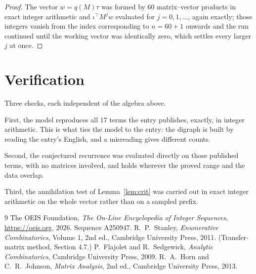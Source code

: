 \documentclass[11pt,a4paper]{article}
\theoremstyle{plain}
\theoremstyle{definition}
\begin{document}
\begin{proof}
The vector $w=q(M)\tau$ was formed by $60$ matrix--vector products in exact integer
arithmetic and $\iota^{\!\top}M^{j}w$ evaluated for $j=0,1,\dots$, again exactly; those
integers vanish from the index corresponding to $n=60+1$ onwards and the run continued
until the working vector was identically zero, which settles every larger $j$ at once.
\end{proof}

\section{Verification}

Three checks, each independent of the algebra above.

First, the model reproduces all $17$ terms the entry publishes, exactly, in integer
arithmetic. This is what ties the model to the entry: the digraph is built by reading the
entry's English, and a misreading gives different counts.

Second, the conjectured recurrence was evaluated directly on those published terms, with no
matrices involved, and holds wherever the proved range and the data overlap.

Third, the annihilation test of Lemma~\ref{lem:crit} was carried out in exact integer
arithmetic on the whole vector rather than on a sampled prefix.

\begin{thebibliography}{9}
 The OEIS Foundation, \emph{The On-Line Encyclopedia of Integer
Sequences}, \url{https://oeis.org}, 2026. Sequence A250947.
 R.~P.~Stanley, \emph{Enumerative Combinatorics}, Volume 1, 2nd ed.,
Cambridge University Press, 2011. (Transfer-matrix method, Section 4.7.)
 P.~Flajolet and R.~Sedgewick, \emph{Analytic Combinatorics}, Cambridge
University Press, 2009.
 R.~A.~Horn and C.~R.~Johnson, \emph{Matrix Analysis}, 2nd ed., Cambridge
University Press, 2013.
\end{thebibliography}
\end{document}
